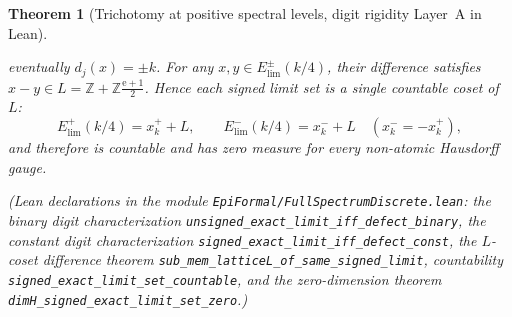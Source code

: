 \documentclass[11pt]{article}
\newtheorem{theorem}{Theorem}
\theoremstyle{definition}
\theoremstyle{remark}
\newcommand{\Z}{\mathbb{Z}}
\newcommand{\ee}{\mathrm{e}}
\begin{document}
\begin{theorem}[Trichotomy at positive spectral levels, digit rigidity Layer~A in Lean]
\begin{enumerate}[label=(\roman*),leftmargin=2em]
eventually $d_j(x)=\pm k$. For any $x,y\in E_{\mathrm{lim}}^\pm(k/4)$, their
difference satisfies $x-y\in L=\Z+\Z\frac{\ee+1}{2}$. Hence each signed limit
set is a single countable coset of $L$:
\[
E_{\mathrm{lim}}^+(k/4)=x_k^+ + L,\qquad
E_{\mathrm{lim}}^-(k/4)=x_k^- + L\quad(x_k^-=-x_k^+),
\]
and therefore is countable and has zero measure for every non-atomic Hausdorff
gauge.
\end{enumerate}
(Lean declarations in the module \texttt{EpiFormal/\allowbreak Full\allowbreak Spectrum\allowbreak Discrete.lean}:
the binary digit characterization \texttt{unsigned\_\allowbreak exact\_\allowbreak limit\_\allowbreak iff\_\allowbreak defect\_\allowbreak binary},
the constant digit characterization \texttt{signed\_\allowbreak exact\_\allowbreak limit\_\allowbreak iff\_\allowbreak defect\_\allowbreak const},
the $L$-coset difference theorem \texttt{sub\_\allowbreak mem\_\allowbreak latticeL\_\allowbreak of\_\allowbreak same\_\allowbreak signed\_\allowbreak limit},
countability \texttt{signed\_\allowbreak exact\_\allowbreak limit\_\allowbreak set\_\allowbreak countable}, and
the zero-dimension theorem \texttt{dimH\_\allowbreak signed\_\allowbreak exact\_\allowbreak limit\_\allowbreak set\_\allowbreak zero}.)
\end{theorem}
\end{document}
